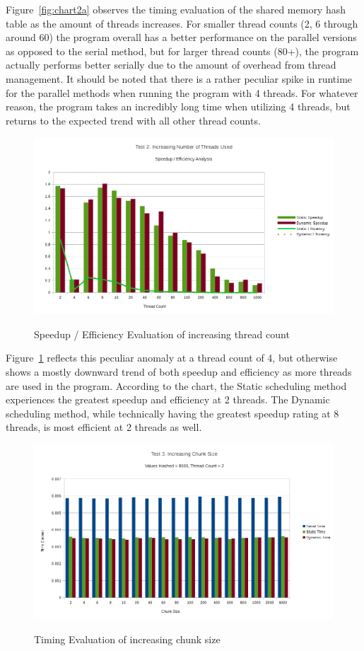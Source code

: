 \documentclass{article}
\begin{document}
Figure~\ref{fig:chart2a} observes the timing evaluation of the shared memory hash table as the amount of threads 
increases. For smaller thread counts (2, 6 through around 60) the program overall has a better performance on the 
parallel versions as opposed to the serial method, but for larger thread counts (80+), the program actually 
performs better serially due to the amount of overhead from thread management. It should be noted that there is 
a rather peculiar spike in runtime for the parallel methods when running the program with 4 threads. For whatever 
reason, the program takes an incredibly long time when utilizing 4 threads, but returns to the expected trend 
with all other thread counts.

\begin{figure}[H]
  \caption{Speedup / Efficiency Evaluation of increasing thread count}
  \centering
  \includegraphics[width=\textwidth]{chart2b}
    \label{fig:chart2b}
\end{figure}

Figure~\ref{fig:chart2b} reflects this peculiar anomaly at a thread count of 4, but otherwise shows a mostly 
downward trend of both speedup and efficiency as more threads are used in the program. According to the chart, 
the Static scheduling method experiences the greatest speedup and efficiency at 2 threads. The Dynamic scheduling 
method, while technically having the greatest speedup rating at 8 threads, is most efficient at 2 threads as well.

\begin{figure}[H]
  \caption{Timing Evaluation of increasing chunk size}
  \centering
  \includegraphics[width=\textwidth]{chart3a}
    \label{fig:chart3a}
\end{figure}
\end{document}
